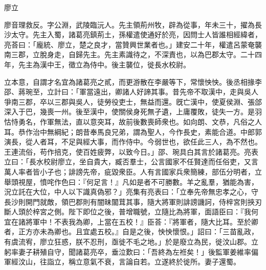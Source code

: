 
\begin{pinyinscope}
廖立

廖音理救反。字公淵，武陵臨沅人。先主領荊州牧，辟為從事，年未三十，擢為長沙太守。先主入蜀，諸葛亮鎮荊土，孫權遣使通好於亮，因問士人皆誰相經緯者，亮荅曰：「龐統、廖立，楚之良才，當贊興世業者也。」建安二十年，權遣呂蒙奄襲南三郡，立脫身走，自歸先主。先主素識待之，不深責也，以為巴郡太守。二十四年，先主為漢中王，徵立為侍中。後主襲位，徙長水校尉。

立本意，自謂才名宜為諸葛亮之貳，而更游散在李嚴等下，常懷怏怏。後丞相掾李邵、蔣琬至，立計曰：「軍當遠出，卿諸人好諦其事。昔先帝不取漢中，走與吳人爭南三郡，卒以三郡與吳人，徒勞役吏士，無益而還。旣亡漢中，使夏侯淵、張郃深入于巴，幾喪一州。後至漢中，使關侯身死無孑遺，上庸覆敗，徒失一方。是羽怙恃勇名，作軍無法，直以意突耳，故前後數喪師衆也。如向朗、文恭，凡俗之人耳。恭作治中無綱紀；朗昔奉馬良兄弟，謂為聖人，今作長史，素能合道。中郎郭演長，從人者耳，不足與經大事，而作侍中。今弱世也，欲任此三人，為不然也。王連流俗，苟作掊克，使百姓疲弊，以致今日。」邵、琬具白其言於諸葛亮。亮表立曰：「長水校尉廖立，坐自貴大，臧否羣士，公言國家不任賢達而任俗吏，又言萬人率者皆小子也；誹謗先帝，疵毀衆臣。人有言國家兵衆簡練，部伍分明者，立舉頭視屋，憤咤作色曰：『何足言！』凡如是者不可勝數。羊之亂羣，猶能為害，況立託在大位，中人以下識真偽邪？」亮集有亮表曰：「立奉先帝無忠孝之心，守長沙則開門就敵，領巴郡則有闇昧闟茸其事，隨大將軍則誹謗譏訶，侍梓宮則挾刃斷人頭於梓宮之側。陛下即位之後，普增職號，立隨比為將軍，面語臣曰：『我何宜在諸將軍中！不表我為卿，上當在五校！』臣荅：『將軍者，隨大比耳。至於卿者，正方亦未為卿也。且宜處五校。』自是之後，怏怏懷恨。」詔曰：「三苗亂政，有虞流宥，廖立狂惑，朕不忍刑，亟徙不毛之地。」於是廢立為民，徙汶山郡。立躬率妻子耕殖自守，聞諸葛亮卒，垂泣歎曰：「吾終為左袵矣！」後監軍姜維率偏軍經汶山，往詣立，稱立意氣不衰，言論自若。立遂終於徙所。妻子還蜀。


\end{pinyinscope}